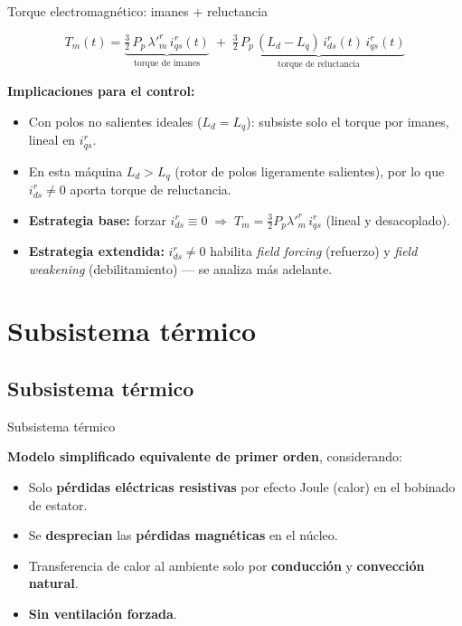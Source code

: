 \documentclass[aspectratio=169,t]{beamer}
\newcommand{\SecPresentacion}{Presentación del problema}
\newcommand{\SecMecanico}{Subsistema mecánico equivalente}
\newcommand{\SecElectromagnetico}{Subsistema electromagnético en coordenadas qd0}
\newcommand{\SecTermico}{Subsistema térmico}
\newcommand{\SecNLGlobal}{Sistema No Lineal Global}
\newcommand{\SecLPV}{Linealización Jacobiana (LPV)}
\newcommand{\SecLTI}{Obtención del modelo LTI equivalente}
\newcommand{\SecAnalisisLTI}{Análisis del modelo LTI aumentado}
\newcommand{\SecDinamica}{Respuesta dinámica en dominio del tiempo}
\newcommand{\SecControlador}{Diseño y análisis del controlador en cascada}
\newcommand{\SecVerifSpecs}{Verificación de desempeño: Especificaciones de operación}
\newcommand{\SecVerifOffset}{Verificación de desempeño: Offset de estado estacionario}
\newcommand{\SecVerifNoIdealidades}{Verificación de desempeño: No idealidades y comportamiento térmico}
\newcommand{\SecDiscretizacion}{Discretización del controlador}
\newcommand{\SecSoftware}{Codificación del software de control}
\newcommand{\AgendaItem}[3]{%
  \ifnum#1=#2
    {\scriptsize\bfseries\color{uncBlue}%
      \hyperlink{sec:#1}{\makebox[2.2em][r]{#1.}\hspace{0.7em}%
      \parbox[t]{0.86\textwidth}{#3}}\par}%
  \else
    {\scriptsize\color{black!26}%
      \hyperlink{sec:#1}{\makebox[2.2em][r]{#1.}\hspace{0.7em}%
      \parbox[t]{0.86\textwidth}{#3}}\par}%
  \fi
  \vspace{0.35mm}%
}
\newcommand{\AgendaBody}[1]{%
    \vspace{3mm}
    {\Large\bfseries\color{uncBlue}Tabla de contenidos\par}
    \vspace{2mm}
    \begin{minipage}{0.94\textwidth}
      \AgendaItem{1}{#1}{\SecPresentacion}
      \AgendaItem{2}{#1}{\SecMecanico}
      \AgendaItem{3}{#1}{\SecElectromagnetico}
      \AgendaItem{4}{#1}{\SecTermico}
      \AgendaItem{5}{#1}\SecNLGlobal
      \AgendaItem{6}{#1}{\SecLPV}
      \AgendaItem{7}{#1}{\SecLTI}
      \AgendaItem{8}{#1}{\SecAnalisisLTI}
      \AgendaItem{9}{#1}{\SecDinamica}
      \AgendaItem{10}{#1}{\SecControlador}
      \AgendaItem{11}{#1}{\SecVerifSpecs}
      \AgendaItem{12}{#1}{\SecVerifOffset}
      \AgendaItem{13}{#1}{\SecVerifNoIdealidades}
      \AgendaItem{14}{#1}{\SecDiscretizacion}
      \AgendaItem{15}{#1}{\SecSoftware}
    \end{minipage}
    \vfill
}
\newcommand{\AgendaSlideTarget}[2]{%
  \begin{frame}[plain]
    \hypertarget{#2}{}%
    \AgendaBody{#1}
  \end{frame}
}
\newcommand{\StartProjectSection}[2]{%
  \section{#2}%
  \subsection{#2}%
  \AgendaSlideTarget{#1}{sec:#1}%
}
\begin{document}
\begin{frame}{Torque electromagnético: imanes + reluctancia}
\vspace{8mm}

\begin{equation*}
\boxed{\;\;
T_m(t) = \underbrace{\tfrac{3}{2}\,P_p\,\lambda'^r_m\,i^{r}_{qs}(t)}_{\text{torque de imanes}} \;+\; \underbrace{\tfrac{3}{2}\,P_p\,(L_d - L_q)\,i^{r}_{ds}(t)\,i^{r}_{qs}(t)}_{\text{torque de reluctancia}}
\;\;}
\end{equation*}

\vspace{8mm}
\textbf{Implicaciones para el control:}
\begin{itemize}\small
\item Con polos no salientes ideales ($L_d=L_q$): subsiste solo el torque por imanes, lineal en $i^{r}_{qs}$.
\item En esta máquina $L_d>L_q$ (rotor de polos ligeramente salientes), por lo que $i^{r}_{ds}\neq 0$ aporta torque de reluctancia.
\item \textbf{Estrategia base:} forzar $i^{r}_{ds}\equiv 0 \;\Rightarrow\; T_m = \tfrac{3}{2}P_p\lambda'^r_m\,i^{r}_{qs}$ (lineal y desacoplado).
\item \textbf{Estrategia extendida:} $i^{r}_{ds}\neq 0$ habilita \emph{field forcing} (refuerzo) y \emph{field weakening} (debilitamiento) — se analiza más adelante.
\end{itemize}
\end{frame}


\StartProjectSection{4}{\SecTermico}
\begin{frame}{Subsistema térmico}
\vspace{6mm}

\textbf{Modelo simplificado equivalente de primer orden}, considerando:
\begin{itemize}
\item Solo \textbf{pérdidas eléctricas resistivas} por efecto Joule (calor) en el bobinado de estator.
\item Se \textbf{desprecian} las \textbf{pérdidas magnéticas} en el núcleo.
\item Transferencia de calor al ambiente solo por \textbf{conducción} y \textbf{convección natural}.
\item \textbf{Sin ventilación forzada}.
\end{itemize}
\end{frame}
\end{document}
